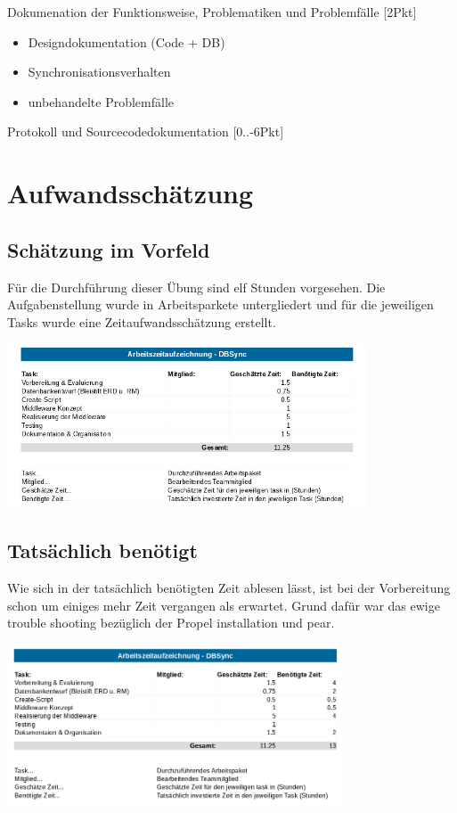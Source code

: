 \documentclass[a4paper]{article}
\begin{document}
	Dokumenation der Funktionsweise, Problematiken und Problemfälle [2Pkt]
	\begin{itemize}
		\item Designdokumentation (Code + DB)
		\item Synchronisationsverhalten
		\item unbehandelte Problemfälle\\
	\end{itemize}
	
	Protokoll und Sourcecodedokumentation [0..-6Pkt]
	
	\newpage
	\section{Aufwandsschätzung}
	\subsection{Schätzung im Vorfeld}
	Für die Durchführung dieser Übung sind elf Stunden vorgesehen.
	Die Aufgabenstellung wurde in Arbeitsparkete untergliedert und für die jeweiligen Tasks wurde eine Zeitaufwandsschätzung erstellt.\\
	\begin{center}
		\includegraphics[width=0.8\textwidth]{img/timetable.png}
		\\
	\end{center}
	\subsection{Tatsächlich benötigt}
	Wie sich in der tatsächlich benötigten Zeit ablesen lässt, ist bei der Vorbereitung schon um einiges mehr Zeit vergangen als erwartet. Grund dafür war das ewige trouble shooting bezüglich der Propel installation und pear.
	\begin{center}
		\includegraphics[width=0.75\textwidth]{img/timetable2.png}
		\\
	\end{center}
	
\end{document}
